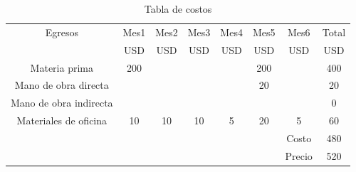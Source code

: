 \begin{table}[htbp]
\begin{center}
\begin{tabular}{c c c c c c c c}
\hline
Egresos &Mes1&Mes2&Mes3&Mes4&Mes5&Mes6&Total\\
 &USD&USD&USD&USD&USD&USD&USD\\
\hline 
Materia prima & 200 & & & &200 && 400 \\
Mano de obra directa &  & & & & 20&& 20 \\
Mano de obra indirecta &  & & & & &&0\\
Materiales de oficina & 10 &10 &10 &5 &20 &5&60\\
\hline 
 &&&&&&Costo&480\\
&&&&&&Precio&520\\
\hline 
\end{tabular}
\caption{Tabla de costos}
\label{tabla:costos}
\end{center}
\end{table}